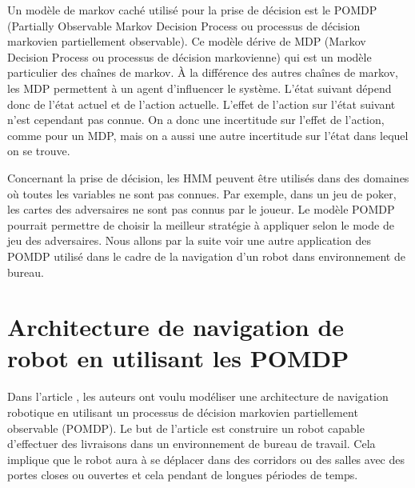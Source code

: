 \documentclass[paper=a4, fontsize=11pt]{scrartcl} %
\numberwithin{equation}{section} %
\numberwithin{figure}{section} %
\numberwithin{table}{section} %
\begin{document}
Un modèle de markov caché utilisé pour la prise de décision est le POMDP (Partially Observable Markov Decision Process ou processus de décision markovien partiellement observable).
Ce modèle dérive de MDP (Markov Decision Process ou processus de décision markovienne) qui est un modèle particulier des chaînes de markov.
À la différence des autres chaînes de markov, les MDP permettent à un agent d'influencer le système.
L'état suivant dépend donc de l'état actuel et de l'action actuelle.
L'effet de l'action sur l'état suivant n'est cependant pas connue.
On a donc une incertitude sur l'effet de l'action, comme pour un MDP, mais on a aussi une autre incertitude sur l'état dans lequel on se trouve.

Concernant la prise de décision, les HMM peuvent être utilisés dans des domaines où toutes les variables ne sont pas connues.
Par exemple, dans un jeu de poker, les cartes des adversaires ne sont pas connus par le joueur.
Le modèle POMDP pourrait permettre de choisir la meilleur stratégie à appliquer selon le mode de jeu des adversaires.
Nous allons par la suite voir une autre application des POMDP utilisé dans le cadre de la navigation d'un robot dans environnement de bureau.

\section{Architecture de navigation de robot en utilisant les POMDP}

Dans l'article \cite{koenig_xavier_1998}, les auteurs ont voulu modéliser une architecture de navigation robotique en utilisant un processus de décision markovien partiellement observable (POMDP).
Le but de l'article est construire un robot capable d'effectuer des livraisons dans un environnement de bureau de travail.
Cela implique que le robot aura à se déplacer dans des corridors ou des salles avec des portes closes ou ouvertes et cela pendant de longues périodes de temps.
\end{document}
